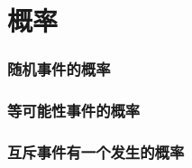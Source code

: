 \chapter{概率}
\subsection{随机事件的概率}

\begin{Practice}
  \begin{question}
    \item 
    \item 
  \end{question}
\end{Practice}
\subsection{等可能性事件的概率}
\begin{Practice}
  \begin{question}
    \item 
    \item 
    \item 
  \end{question}
\end{Practice}

\begin{Exercise}
  \begin{question}
    \item 
    \item 
    \item 
    \item 
    \item 
    \item 
    \item 
    \item 
    \item 
    \item 
    \item 
    \item 
    \item 
  \end{question}
\end{Exercise}

\subsection{互斥事件有一个发生的概率}
\begin{Practice}
  \begin{question}
    \item 
    \item 
  \end{question}
\end{Practice}

